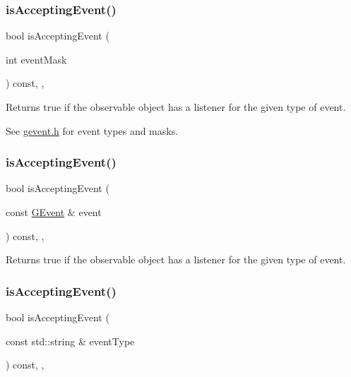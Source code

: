 \subsubsection{\texorpdfstring{is\+Accepting\+Event()}{isAcceptingEvent()}\hspace{0.1cm}{\footnotesize\ttfamily [1/3]}}
{\footnotesize\ttfamily bool is\+Accepting\+Event (\begin{DoxyParamCaption}\item[{int}]{event\+Mask }\end{DoxyParamCaption}) const\hspace{0.3cm}{\ttfamily [protected]}, {\ttfamily [virtual]}, {\ttfamily [inherited]}}



Returns true if the observable object has a listener for the given type of event. 

See \mbox{\hyperlink{gevent_8h_source}{gevent.\+h}} for event types and masks. \mbox{\label{classsgl_1_1GObservable_aa31c73145a29dcb92848a92e0cfaea41}} 
\subsubsection{\texorpdfstring{is\+Accepting\+Event()}{isAcceptingEvent()}\hspace{0.1cm}{\footnotesize\ttfamily [2/3]}}
{\footnotesize\ttfamily bool is\+Accepting\+Event (\begin{DoxyParamCaption}\item[{const \mbox{\hyperlink{classsgl_1_1GEvent}{G\+Event}} \&}]{event }\end{DoxyParamCaption}) const\hspace{0.3cm}{\ttfamily [protected]}, {\ttfamily [virtual]}, {\ttfamily [inherited]}}



Returns true if the observable object has a listener for the given type of event. 

\mbox{\label{classsgl_1_1GObservable_a3b1c689267eda44e65a2213e7de38b23}} 
\subsubsection{\texorpdfstring{is\+Accepting\+Event()}{isAcceptingEvent()}\hspace{0.1cm}{\footnotesize\ttfamily [3/3]}}
{\footnotesize\ttfamily bool is\+Accepting\+Event (\begin{DoxyParamCaption}\item[{const std\+::string \&}]{event\+Type }\end{DoxyParamCaption}) const\hspace{0.3cm}{\ttfamily [protected]}, {\ttfamily [virtual]}, {\ttfamily [inherited]}}



